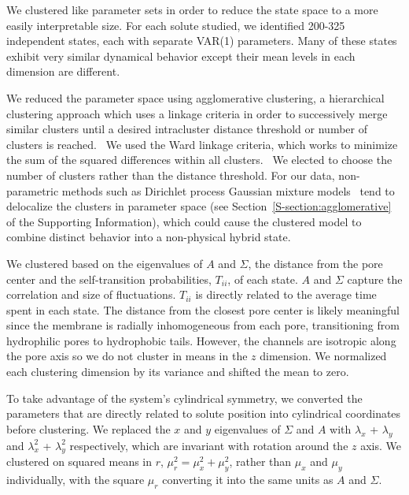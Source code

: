 \documentclass[journal=jpcbfk,manuscript=article]{achemso}
\begin{document}
  We clustered like parameter sets in order to reduce the state space to
  a more easily interpretable size. For each solute studied, we identified 200-325
  independent states, each with separate VAR(1) parameters. Many of these states
  exhibit very similar dynamical behavior except their mean levels in each dimension
  are different.
  
  We reduced the parameter space using agglomerative clustering, a hierarchical
  clustering approach which uses a linkage criteria in order to successively merge
  similar clusters until a desired intracluster distance threshold or number of
  clusters is reached.~\cite{pedregosa_scikit-learn_2011} We used the Ward linkage 
  criteria, which works to minimize the sum of the squared differences within all
  clusters.~\cite{ward_hierarchical_1963} We elected to choose the number of clusters
  rather than the distance threshold. For our data, non-parametric methods such as 
  Dirichlet process Gaussian mixture models~\cite{pedregosa_scikit-learn_2011,gelman_bayesian_2013}
  tend to delocalize the clusters in parameter space (see Section~\ref{S-section:agglomerative}
  of the Supporting Information), which could cause the clustered model to combine 
  distinct behavior into a non-physical hybrid state.

  We clustered based on the eigenvalues of $A$ and $\Sigma$, the distance from the 
  pore center and the self-transition probabilities, $T_{ii}$, of each state. $A$ 
  and $\Sigma$ capture the correlation and size of fluctuations. $T_{ii}$ is directly
  related to the average time spent in each state. The distance from the closest pore 
  center is likely meaningful since the membrane is radially inhomogeneous from each 
  pore, transitioning from hydrophilic pores to hydrophobic tails. However, the 
  channels are isotropic along the pore axis so we do not 
  cluster
  in means in the $z$ dimension.
  We normalized each clustering dimension by its variance and shifted the mean to zero.
  
  To take advantage of the system's cylindrical symmetry, we converted the parameters that
  are directly related to solute position into cylindrical coordinates before clustering. 
  We replaced the $x$ and $y$ eigenvalues of $\Sigma$ and $A$ with $\lambda_x$ + 
  $\lambda_y$ and $\lambda_x^2$ + $\lambda_y^2$ respectively, which are invariant with 
  rotation around the $z$ axis. 
  We clustered on squared means in $r$, $\mu_r^2 = \mu_x^2 + \mu_y^2$, rather than
  $\mu_x$ and $\mu_y$ individually, with the square $\mu_r$ converting it into the 
  same units as $A$ and $\Sigma$.
\end{document}
